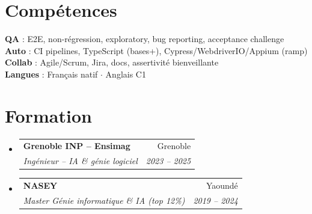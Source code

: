 \documentclass[a4paper,10.5pt]{article}
\makeatletter
\newcommand{\resumeSubheading}[4]{\vspace{2.5pt}\item\begin{tabular*}{0.97\textwidth}[t]{l@{\extracolsep{\fill}}r}\textbf{#1}&{#2}\\\textit{\small #3}&\textit{\small #4}\\\end{tabular*}\vspace{1pt}}
\newcommand{\resumeSubHeadingListStart}{\begin{itemize}[leftmargin=0.08in,label={}]}
\newcommand{\resumeSubHeadingListEnd}{\end{itemize}}
\makeatother
\begin{document}
\section{Comp\'etences}
\begin{itemize}[leftmargin=0.08in,label={}]\small{\item{
\textbf{QA} : E2E, non-r\'egression, exploratory, bug reporting, acceptance challenge \\
\textbf{Auto} : CI pipelines, TypeScript (bases+), Cypress/WebdriverIO/Appium (ramp) \\
\textbf{Collab} : Agile/Scrum, Jira, docs, assertivit\'e bienveillante \\
\textbf{Langues} : Fran\c{c}ais natif $\cdot$ Anglais C1
}}\end{itemize}

\section{Formation}
\resumeSubHeadingListStart
  \resumeSubheading{Grenoble INP -- Ensimag}{Grenoble}{Ing\'enieur -- IA \& g\'enie logiciel}{2023 -- 2025}
  \resumeSubheading{NASEY}{Yaound\'e}{Master G\'enie informatique \& IA (top 12\%)}{2019 -- 2024}
\resumeSubHeadingListEnd
\end{document}
